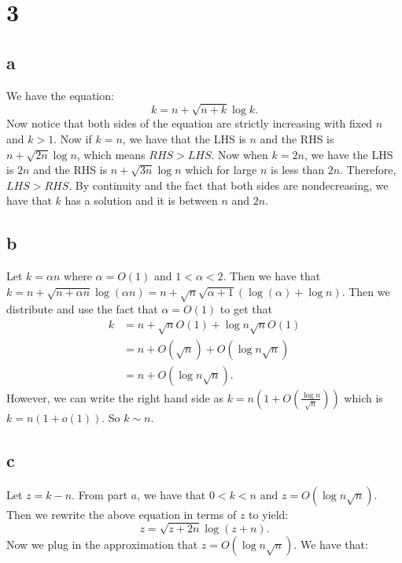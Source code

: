 \documentclass[]{article}
\begin{document}
\section{3}
\subsection{a}
We have the equation:
\begin{equation}
	k = n + \sqrt{n + k} \log k.
\end{equation}
Now notice that both sides of the equation are strictly increasing with fixed $n$ and $k > 1$. Now if $k = n$, we have that the LHS is $n$ and the RHS is $n + \sqrt{2n} \log n$, which means $RHS > LHS$. Now when $k = 2n$, we have the LHS is $2n$ and the RHS is $n + \sqrt{3n} \log n$ which for large $n$ is less than $2n$. Therefore, $LHS > RHS$. By continuity and the fact that both sides are nondecreasing, we have that $k$ has a solution and it is between $n$ and $2n$. 
\subsection{b}
Let $k = \alpha n$ where $\alpha = O(1)$ and $1 < \alpha < 2$. 
Then we have that 
$k = n + \sqrt{n + \alpha n} \log (\alpha n) = n + \sqrt{n} \sqrt{\alpha + 1} (\log(\alpha) + \log n)$. Then we distribute and use the fact that $\alpha = O(1)$ to get that
\begin{align*}
	k &= n + \sqrt{n} O(1) + \log n \sqrt{n} O(1)\\
	 &= n + O(\sqrt{n}) + O(\log n \sqrt{n})\\
	 &= n + O(\log n \sqrt n).
\end{align*}
However, we can write the right hand side as $k = n(1 + O(\frac{\log n}{\sqrt{n}}))$ which is $k = n(1 + o(1))$. So $k \sim n$. 
\subsection{c}
Let $z = k - n$. From part $a$, we have that $0 < k < n$ and $z =  O(\log n \sqrt n)$. Then we rewrite the above equation in terms of $z$ to yield:
\begin{equation}
	z = \sqrt{z + 2n} \log (z + n).
\end{equation}
Now we plug in the approximation that $z = O(\log n \sqrt{n})$. We have that:
\end{document}
